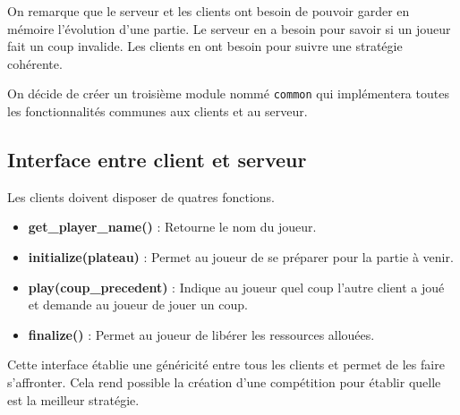 On remarque que le serveur et les clients ont besoin de pouvoir garder en mémoire l'évolution d'une partie.
Le serveur en a besoin pour savoir si un joueur fait un coup invalide.
Les clients en ont besoin pour suivre une stratégie cohérente.

On décide de créer un troisième module nommé \verb|common| qui implémentera toutes les fonctionnalités communes 
aux clients et au serveur.

\subsection{Interface entre client et serveur}

Les clients doivent disposer de quatres fonctions.
\begin{itemize}
    \item \textbf{get\_player\_name()} : Retourne le nom du joueur.
    \item \textbf{initialize(plateau)} : Permet au joueur de se préparer pour la partie à venir.
    \item \textbf{play(coup\_precedent)} : Indique au joueur quel coup l'autre client a joué et demande au joueur de jouer un coup.
    \item \textbf{finalize()} : Permet au joueur de libérer les ressources allouées.
\end{itemize}

Cette interface établie une généricité entre tous les clients et permet de les faire s'affronter.
Cela rend possible la création d'une compétition pour établir quelle est 
la meilleur stratégie.